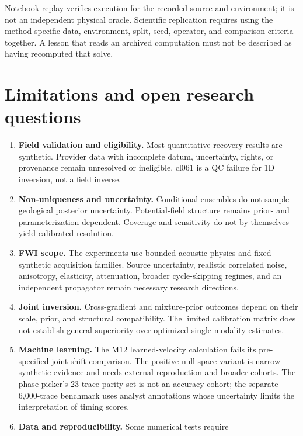 Notebook replay verifies execution for the recorded source and
environment; it is not an independent physical oracle. Scientific
replication requires using the method-specific data, environment, split,
seed, operator, and comparison criteria together. A lesson that reads an
archived computation must not be described as having recomputed that
solve.

\section{Limitations and open research
questions}\label{limitations-and-open-research-questions}

\begin{enumerate}
\def\labelenumi{\arabic{enumi}.}
\tightlist
\item
  \textbf{Field validation and eligibility.} Most quantitative recovery
  results are synthetic. Provider data with incomplete datum,
  uncertainty, rights, or provenance remain unresolved or ineligible.
  cl061 is a QC failure for 1D inversion, not a field inverse.
\item
  \textbf{Non-uniqueness and uncertainty.} Conditional ensembles do not
  sample geological posterior uncertainty. Potential-field structure
  remains prior- and parameterization-dependent. Coverage and
  sensitivity do not by themselves yield calibrated resolution.
\item
  \textbf{FWI scope.} The experiments use bounded acoustic physics and
  fixed synthetic acquisition families. Source uncertainty, realistic
  correlated noise, anisotropy, elasticity, attenuation, broader
  cycle-skipping regimes, and an independent propagator remain necessary
  research directions.
\item
  \textbf{Joint inversion.} Cross-gradient and mixture-prior outcomes
  depend on their scale, prior, and structural compatibility. The
  limited calibration matrix does not establish general superiority over
  optimized single-modality estimates.
\item
  \textbf{Machine learning.} The M12 learned-velocity calculation fails
  its pre-specified joint-shift comparison. The positive null-space
  variant is narrow synthetic evidence and needs external reproduction
  and broader cohorts. The phase-picker's 23-trace parity set is not an
  accuracy cohort; the separate 6,000-trace benchmark uses analyst
  annotations whose uncertainty limits the interpretation of timing
  scores.
\item
  \textbf{Data and reproducibility.} Some numerical tests require

\end{enumerate}
